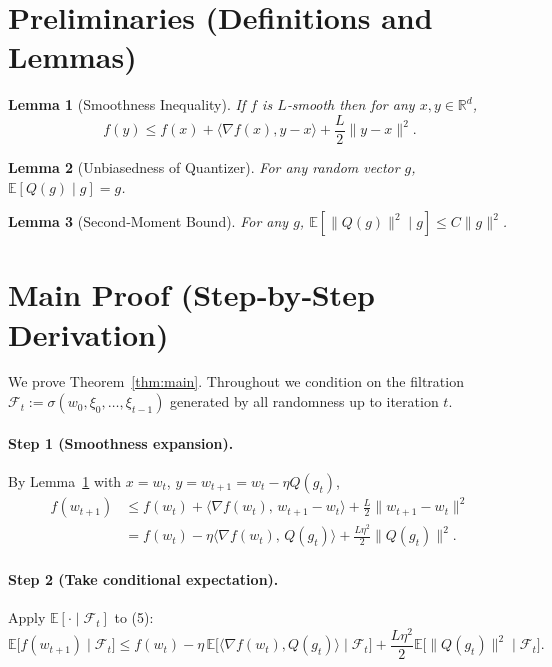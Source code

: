 \documentclass{article}
\newtheorem{lemma}{Lemma}
\newcommand{\E}{\mathbb{E}}
\newcommand{\R}{\mathbb{R}}
\begin{document}
\section*{Preliminaries (Definitions and Lemmas)}
\begin{lemma}[Smoothness Inequality]\label{lem:smooth}
If $f$ is $L$‑smooth then for any $x,y\in\R^{d}$,
\[
f(y)\le f(x)+\langle\nabla f(x),y-x\rangle+\frac{L}{2}\|y-x\|^{2}.
\]
\end{lemma}
\begin{lemma}[Unbiasedness of Quantizer]\label{lem:unbiased}
For any random vector $g$, $\E[Q(g)\mid g]=g$.
\end{lemma}
\begin{lemma}[Second‑Moment Bound]\label{lem:second}
For any $g$, $\E[\|Q(g)\|^{2}\mid g]\le C\|g\|^{2}$.
\end{lemma}

\section*{Main Proof (Step‑by‑Step Derivation)}
We prove Theorem~\ref{thm:main}.  Throughout we condition on the filtration
$\mathcal{F}_t:=\sigma(w_0,\xi_0,\dots,\xi_{t-1})$ generated by all randomness up to
iteration $t$.

\paragraph{Step 1 (Smoothness expansion).}
By Lemma~\ref{lem:smooth} with $x=w_t$, $y=w_{t+1}=w_t-\eta Q(g_t)$,
\[
\begin{aligned}
f(w_{t+1})
&\le f(w_t)+\langle\nabla f(w_t),\,w_{t+1}-w_t\rangle
   +\frac{L}{2}\|w_{t+1}-w_t\|^{2}\\
&= f(w_t)-\eta\langle\nabla f(w_t),\,Q(g_t)\rangle
   +\frac{L\eta^{2}}{2}\|Q(g_t)\|^{2}.          \tag{5}
\end{aligned}
\]
\paragraph{Step 2 (Take conditional expectation).}
Apply $\E[\cdot\mid\mathcal{F}_t]$ to (5):
\[
\E\!\big[f(w_{t+1})\mid\mathcal{F}_t\big]
\le f(w_t)-\eta\,\E\!\big[\langle\nabla f(w_t),Q(g_t)\rangle\mid\mathcal{F}_t\big]
   +\frac{L\eta^{2}}{2}\E\!\big[\|Q(g_t)\|^{2}\mid\mathcal{F}_t\big]. \tag{6}
\]
\end{document}
